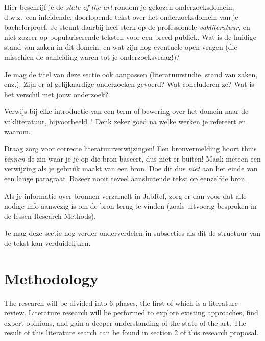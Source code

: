 Hier beschrijf je de \emph{state-of-the-art} rondom je gekozen onderzoeksdomein, d.w.z.\ een inleidende, doorlopende tekst over het onderzoeksdomein van je bachelorproef. Je steunt daarbij heel sterk op de professionele \emph{vakliteratuur}, en niet zozeer op populariserende teksten voor een breed publiek. Wat is de huidige stand van zaken in dit domein, en wat zijn nog eventuele open vragen (die misschien de aanleiding waren tot je onderzoeksvraag!)?

Je mag de titel van deze sectie ook aanpassen (literatuurstudie, stand van zaken, enz.). Zijn er al gelijkaardige onderzoeken gevoerd? Wat concluderen ze? Wat is het verschil met jouw onderzoek?

Verwijs bij elke introductie van een term of bewering over het domein naar de vakliteratuur, bijvoorbeeld~\autocite{Hykes2013}! Denk zeker goed na welke werken je refereert en waarom.

Draag zorg voor correcte literatuurverwijzingen! Een bronvermelding hoort thuis \emph{binnen} de zin waar je je op die bron baseert, dus niet er buiten! Maak meteen een verwijzing als je gebruik maakt van een bron. Doe dit dus \emph{niet} aan het einde van een lange paragraaf. Baseer nooit teveel aansluitende tekst op eenzelfde bron.

Als je informatie over bronnen verzamelt in JabRef, zorg er dan voor dat alle nodige info aanwezig is om de bron terug te vinden (zoals uitvoerig besproken in de lessen Research Methods).


Je mag deze sectie nog verder onderverdelen in subsecties als dit de structuur van de tekst kan verduidelijken.

\section{Methodology}%
\label{sec:methodology}

The research will be divided into 6 phases, the first of which is a literature review. Literature research will be performed to explore existing approaches, find expert opinions, and gain a deeper understanding of the state of the art. The result of this literature search can be found in section 2 of this research proposal.

